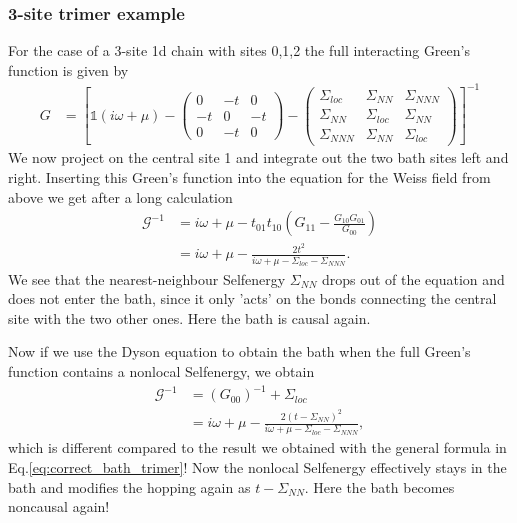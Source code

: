 \documentclass[12pt,a4paper]{scrartcl}
\numberwithin{equation}{section}
\newcommand{\unity}{\mathds{1}}
\begin{document}
\subsubsection{3-site trimer example}
For the case of a 3-site 1d chain with sites 0,1,2 the full interacting Green's function is given by
\begin{align}
G &=
\left[ \unity (i\omega + \mu ) -
 \begin{pmatrix}
     0 & -t & 0 \\  -t & 0 & -t \\ 0 & -t & 0
 \end{pmatrix}
 -
 \begin{pmatrix}
     \Sigma_{loc} & \Sigma_{NN} & \Sigma_{NNN} \\ \Sigma_{NN} & \Sigma_{loc} & \Sigma_{NN} \\ \Sigma_{NNN} & \Sigma_{NN} & \Sigma_{loc}
 \end{pmatrix}
 \right]^{-1} 
\end{align}
We now project on the central site 1 and integrate out the two bath sites left and right.
Inserting this Green's function into the equation for the Weiss field from above we get after a long calculation
\begin{align}
 \mathscr{G}^{-1} &= i\omega + \mu -  t_{01} t_{10} \left( G_{11} - \frac{G_{10} G_{01} }{G_{00}} \right) \\
 &= i\omega + \mu -  \frac{2t^2}{i\omega + \mu-\Sigma_{loc}-\Sigma_{NNN} } . \label{eq:correct_bath_trimer}
\end{align}
We see that the nearest-neighbour Selfenergy $\Sigma_{NN}$ drops out of the equation and does not enter the bath,
since it only 'acts' on the bonds connecting the central site with the two other ones.
Here the bath is causal again.

Now if we use the Dyson equation to obtain the bath when the full Green's function contains a nonlocal Selfenergy,
we obtain
\begin{align}
 \mathscr{G}^{-1} 
 &= (G_{00})^{-1} + \Sigma_{loc}  \\
 &= i\omega + \mu -  \frac{2(t-\Sigma_{NN})^2}{i\omega + \mu-\Sigma_{loc} - \Sigma_{NNN} } ,
\end{align}
which is different compared to the result we obtained with the general formula in Eq.\eqref{eq:correct_bath_trimer}!
Now the nonlocal Selfenergy effectively stays in the bath and modifies the 
hopping again as $t-\Sigma_{NN}$. Here the bath becomes noncausal again!
\end{document}

